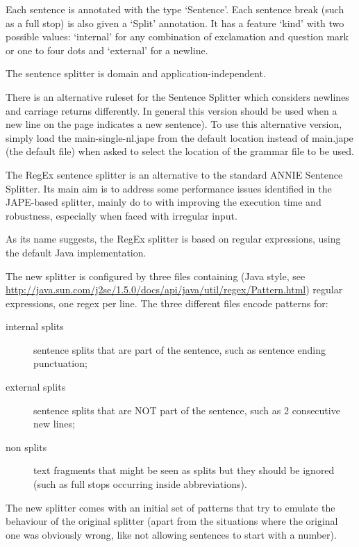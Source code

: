Each sentence is annotated with the type `Sentence'.
Each sentence break (such as a full stop) is also given a `Split'
annotation. It has a feature `kind' with two possible values: `internal' for
any combination of exclamation and question mark or one to four dots and
`external' for a newline.

The sentence splitter is domain and application-independent.

There is an alternative ruleset for the Sentence Splitter which
considers newlines and carriage returns differently. In general this
version should be used when a new line on the page indicates a new
sentence).  To use this alternative version, simply load the
main-single-nl.jape from the default location instead of main.jape
(the default file) when asked to select the location of the grammar
file to be used.


The RegEx sentence splitter is an alternative to the standard ANNIE Sentence
Splitter. Its main aim is to address some performance issues identified in the
JAPE-based splitter, mainly do to with improving the execution time and
robustness, especially when faced with irregular input.

As its name suggests, the RegEx splitter is based on regular expressions,
using the default Java implementation.

The new splitter is configured by three files containing (Java style, 
see
\url{http://java.sun.com/j2se/1.5.0/docs/api/java/util/regex/Pattern.html})
regular expressions, one regex per line. The three different files  encode
patterns for:
\begin{description}
  \item[internal splits] sentence splits that are part of the sentence, such
  as sentence ending punctuation;
  \item[external splits] sentence splits that are NOT part of the sentence,
  such as 2 consecutive new lines;
  \item[non splits] text fragments that might be seen as splits but they
  should be ignored (such as full stops occurring inside abbreviations).
\end{description}

The new splitter comes with an initial set of patterns that try to 
emulate the behaviour of the original splitter (apart from the 
situations where the original one was obviously wrong, like not allowing 
sentences to start with a number).

